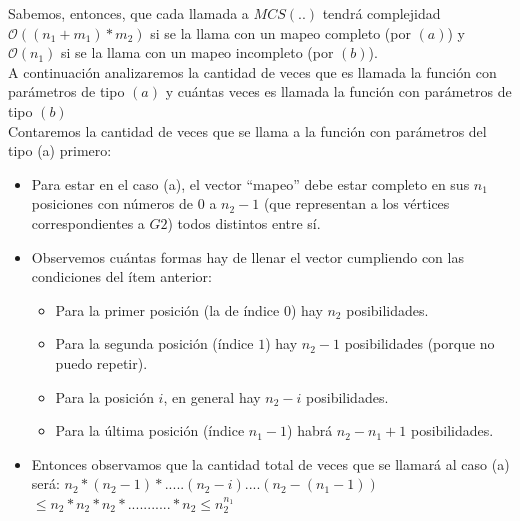 \noindent Sabemos, entonces, que cada llamada a $MCS(..)$ tendrá complejidad $\mathcal{O}((n_1 + m_1)*m_2)$ si se la llama con un mapeo completo (por $(a)$) y $\mathcal{O}(n_1)$ si se la llama con un mapeo incompleto (por $(b)$).\\
A continuación analizaremos la cantidad de veces que es llamada la función con parámetros de tipo $(a)$ y cuántas veces es llamada la función con parámetros de tipo $(b)$\\
Contaremos la cantidad de veces que se llama a la función con parámetros del tipo (a) primero:

\begin{itemize}
\item Para estar en el caso (a), el vector ``mapeo'' debe estar completo en sus $n_1$ posiciones con números de $0$ a $n_2 - 1$ (que representan a los vértices correspondientes a $G2$) todos distintos entre sí.
\item Observemos cuántas formas hay de llenar el vector cumpliendo con las condiciones del ítem anterior:\\

\begin{itemize}
\item Para la primer posición (la de índice $0$) hay $n_2$ posibilidades.
\item Para la segunda posición (índice $1$) hay $n_2 - 1$ posibilidades (porque no puedo repetir).
\item Para la posición $i$, en general hay $n_2-i$ posibilidades.
\item Para la última posición (índice $n_1-1$) habrá $n_2-n_1+1$ posibilidades.
\end{itemize}

\item Entonces observamos que la cantidad total de veces que se llamará al caso (a) será:
$n_2 * (n_2-1)*.....(n_2-i)....(n_2-(n_1-1))$ $\leq n_2 * n_2 * n_2*...........*n_2 \leq n_2^{n_1}$
\end{itemize}

